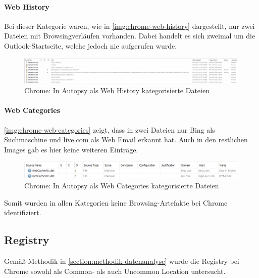 \begin{appendices}
\paragraph*{Web History}\label{chap:anhang-chrome-uncommon-autopsy-web-history}

Bei dieser Kategorie waren, wie in \autoref{img:chrome-web-history} dargestellt, nur zwei Dateien mit Browsingverläufen vorhanden. Dabei handelt es sich zweimal um die Outlook-Startseite, welche jedoch nie aufgerufen wurde.

\begin{figure}[ht]
	\centering
	\includegraphics[width=\textwidth]{bilder/CHHis.png}
	\caption{Chrome: In Autopsy als \glqq{}Web History\grqq{} kategorisierte Dateien}
	\label{img:chrome-web-history}  
\end{figure}

\paragraph*{Web Categories}\label{chap:anhang-chrome-uncommon-autopsy-web-categories}
\autoref{img:chrome-web-categories} zeigt, dass in zwei	 Dateien nur Bing als Suchmaschine und live.com als \glqq{}Web Email\grqq{} erkannt hat. Auch in den restlichen Images gab es hier keine weiteren Einträge.


\begin{figure}[h!]
	\centering
	\includegraphics[width=\textwidth]{bilder/CHCat2.png}
	\caption{Chrome: In Autopsy als \glqq{}Web Categories\grqq{} kategorisierte Dateien}
	\label{img:chrome-web-categories}  
\end{figure}

Somit wurden in allen Kategorien keine Browsing-Artefakte bei Chrome identifiziert.

\subsection{Registry}\label{chap:anhang-chrome-registry}
Gemäß Methodik in \autoref{section:methodik-datenanalyse} wurde die Registry bei Chrome sowohl als Common- als auch Uncommon Location untersucht.


\end{appendices}
